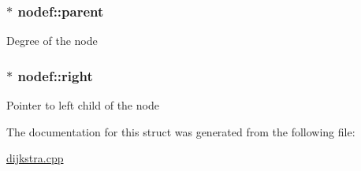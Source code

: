 \subsubsection[{\texorpdfstring{parent}{parent}}]{$\ast$ nodef\+::parent}\hypertarget{structnodef_aea7c4854fecb939b9a236cfa62dc1db3}{}\label{structnodef_aea7c4854fecb939b9a236cfa62dc1db3}
Degree of the node 
\subsubsection[{\texorpdfstring{right}{right}}]{$\ast$ nodef\+::right}\hypertarget{structnodef_a4242670aeeda1dc26715fb0f1b63661c}{}\label{structnodef_a4242670aeeda1dc26715fb0f1b63661c}
Pointer to left child of the node 

The documentation for this struct was generated from the following file\+:\begin{DoxyCompactItemize}
\item 
\hyperlink{dijkstra_8cpp}{dijkstra.\+cpp}\end{DoxyCompactItemize}
